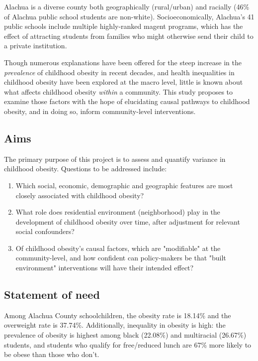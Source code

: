 \documentclass[11pt]{article}
\begin{document}
Alachua is a diverse county both geographically (rural/urban) and racially (46\% of Alachua public school students are non-white)\cite{Brew2014}.  Socioeconomically, Alachua's 41 public schools include multiple highly-ranked magent programs, which has the effect of attracting students from families who might otherwise send their child to a private institution.

Though numerous explanations have been offered for the steep increase in the \emph{prevalence} of childhood obesity in recent decades\cite{Bishop2005}, and health inequalities in childhood obesity have been explored at the macro level\cite{2013}\cite{Drewnowski2009}, little is known about what affects childhood obesity \emph{within} a community. This study proposes to examine those factors with the hope of elucidating causal pathways to childhood obesity, and in doing so, inform community-level interventions. 

\subsection*{Aims}
The primary purpose of this project is to assess and quantify variance in childhood obesity.  Questions to be addressed include:
\begin{enumerate}
\item Which social, economic, demographic and geographic features are most closely associated with childhood obesity?
\item What role does residential environment (neighborhood) play in the development of childhood obesity over time, after adjustment for relevant social confounders?
\item Of childhood obesity's causal factors, which are "modifiable" at the community-level, and how confident can policy-makers be that "built environment" interventions will have their intended effect?
\end{enumerate}

\subsection*{Statement of need}
Among Alachua County schoolchildren, the obesity rate is 18.14\% and the overweight rate is 37.74\%. Additionally, inequality in obesity is high: the prevalence of obesity is highest among black (22.08\%) and multiracial (26.67\%) students, and students who qualify for free/reduced lunch are 67\% more likely to be obese than those who don't.\cite{Brew2014}    
\end{document}
